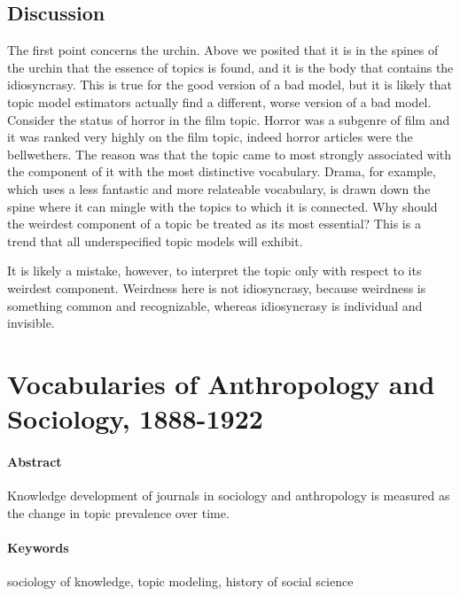 \documentclass[]{book}
\theoremstyle{definition}
\theoremstyle{definition}
\theoremstyle{definition}
\theoremstyle{remark}
\begin{document}
\hypertarget{discussion-1}{%
\section{Discussion}\label{discussion-1}}

The first point concerns the urchin. Above we posited that it is in the
spines of the urchin that the essence of topics is found, and it is the
body that contains the idiosyncrasy. This is true for the good version
of a bad model, but it is likely that topic model estimators actually
find a different, worse version of a bad model. Consider the status of
horror in the film topic. Horror was a subgenre of film and it was
ranked very highly on the film topic, indeed horror articles were the
bellwethers. The reason was that the topic came to most strongly
associated with the component of it with the most distinctive
vocabulary. Drama, for example, which uses a less fantastic and more
relateable vocabulary, is drawn down the spine where it can mingle with
the topics to which it is connected. Why should the weirdest component
of a topic be treated as its most essential? This is a trend that all
underspecified topic models will exhibit.

It is likely a mistake, however, to interpret the topic only with
respect to its weirdest component. Weirdness here is not idiosyncrasy,
because weirdness is something common and recognizable, whereas
idiosyncrasy is individual and invisible.

\hypertarget{voc}{%
\chapter{Vocabularies of Anthropology and Sociology,
1888-1922}\label{voc}}

\hypertarget{abstract-3}{%
\subsubsection*{Abstract}\label{abstract-3}}


Knowledge development of journals in sociology and
anthropology is measured as the change in topic prevalence over time.

\hypertarget{keywords-3}{%
\subsubsection*{Keywords}\label{keywords-3}}


sociology of knowledge, topic modeling, history of social
science
\end{document}
